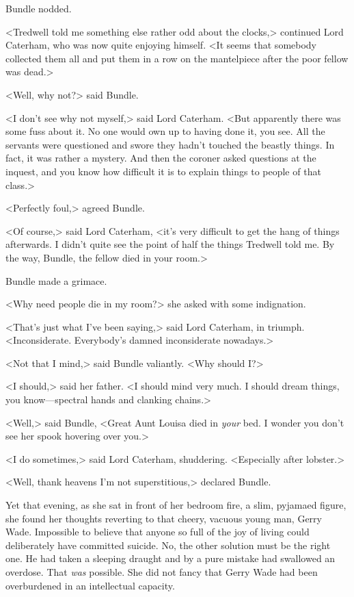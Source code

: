 Bundle nodded.

<Tredwell told me something else rather odd about the clocks,> continued Lord Caterham, who was now quite enjoying himself. <It seems that somebody collected them all and put them in a row on the mantelpiece after the poor fellow was dead.>

<Well, why not?> said Bundle.

<I don't see why not myself,> said Lord Caterham. <But apparently there was some fuss about it. No one would own up to having done it, you see. All the servants were questioned and swore they hadn't touched the beastly things. In fact, it was rather a mystery. And then the coroner asked questions at the inquest, and you know how difficult it is to explain things to people of that class.>

<Perfectly foul,> agreed Bundle.

<Of course,> said Lord Caterham, <it's very difficult to get the hang of things afterwards. I didn't quite see the point of half the things Tredwell told me. By the way, Bundle, the fellow died in your room.>

Bundle made a grimace.

<Why need people die in my room?> she asked with some indignation.

<That's just what I've been saying,> said Lord Caterham, in triumph. <Inconsiderate. Everybody's damned inconsiderate nowadays.>

<Not that I mind,> said Bundle valiantly. <Why should I?>

<I should,> said her father. <I should mind very much. I should dream things, you know—spectral hands and clanking chains.>

<Well,> said Bundle, <Great Aunt Louisa died in \emph{your} bed. I wonder you don't see her spook hovering over you.>

<I do sometimes,> said Lord Caterham, shuddering. <Especially after lobster.>

<Well, thank heavens I'm not superstitious,> declared Bundle.

Yet that evening, as she sat in front of her bedroom fire, a slim, pyjamaed figure, she found her thoughts reverting to that cheery, vacuous young man, Gerry Wade. Impossible to believe that anyone so full of the joy of living could deliberately have committed suicide. No, the other solution must be the right one. He had taken a sleeping draught and by a pure mistake had swallowed an overdose. That \emph{was} possible. She did not fancy that Gerry Wade had been overburdened in an intellectual capacity.

